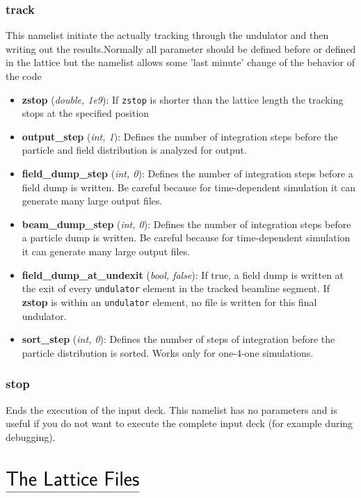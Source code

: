 \documentclass[12pt]{book}
\begin{document}
\subsection{\sf track}
This namelist initiate the actually tracking through the undulator and then writing out the results.Normally all parameter should be defined before or defined in the lattice but the namelist allows some 'last minute' change of the behavior of the code

\begin{itemize}
\item {\bf zstop} ({\it double, 1e9}): If {\tt zstop} is shorter than the lattice length the tracking stops at the specified position
\item {\bf output\_step} ({\it int, 1}): Defines the number of integration steps before the particle and field distribution is analyzed for output.
\item {\bf field\_dump\_step} ({\it int, 0}): Defines the number of integration steps before a field dump is written. Be careful because for time-dependent simulation it can generate many large output files.
\item {\bf beam\_dump\_step} ({\it int, 0}): Defines the number of integration steps before a particle dump is written. Be careful because for time-dependent simulation it can generate many large output files.
\item {\bf field\_dump\_at\_undexit} ({\it bool, false}): If true, a field dump is written at the exit of every {\tt undulator} element in the tracked beamline segment. If {\bf zstop} is within an {\tt undulator} element, no file is written for this final undulator.
\item {\bf sort\_step} ({\it int, 0}): Defines the number of steps of integration before the particle distribution is sorted. Works only for one-4-one simulations.

\end{itemize}


\subsection{\sf stop}
Ends the execution of the input deck. This namelist has no parameters and is useful if you do not want to execute the complete input deck (for example during debugging).


\chapter*{\vspace{-3cm}$\underline{\mbox{\rule[-0.5em]{0cm}{1em}\huge\sf The Lattice Files}}$}
\end{document}
